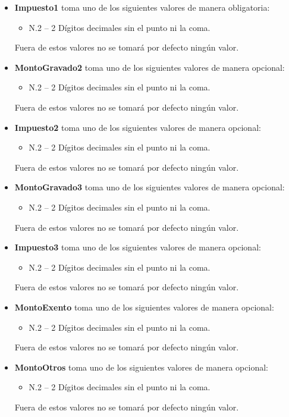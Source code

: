 \documentclass{article}
\begin{document}
\begin{itemize}
    \item \textbf{Impuesto1} toma uno de los siguientes valores de manera obligatoria:
    \begin{itemize}
        \item N.2 – 2 Dígitos decimales sin el punto ni la coma.
    \end{itemize}
    Fuera de estos valores no se tomará por defecto ningún valor.

    \item \textbf{MontoGravado2} toma uno de los siguientes valores de manera opcional:
    \begin{itemize}
        \item N.2 – 2 Dígitos decimales sin el punto ni la coma.
    \end{itemize}
    Fuera de estos valores no se tomará por defecto ningún valor.

    \item \textbf{Impuesto2} toma uno de los siguientes valores de manera opcional:
    \begin{itemize}
        \item N.2 – 2 Dígitos decimales sin el punto ni la coma.
    \end{itemize}
    Fuera de estos valores no se tomará por defecto ningún valor.

    \item \textbf{MontoGravado3} toma uno de los siguientes valores de manera opcional:
    \begin{itemize}
        \item N.2 – 2 Dígitos decimales sin el punto ni la coma.
    \end{itemize}
    Fuera de estos valores no se tomará por defecto ningún valor.

    \item \textbf{Impuesto3} toma uno de los siguientes valores de manera opcional:
    \begin{itemize}
        \item N.2 – 2 Dígitos decimales sin el punto ni la coma.
    \end{itemize}
    Fuera de estos valores no se tomará por defecto ningún valor.

    \item \textbf{MontoExento} toma uno de los siguientes valores de manera opcional:
    \begin{itemize}
        \item N.2 – 2 Dígitos decimales sin el punto ni la coma.
    \end{itemize}
    Fuera de estos valores no se tomará por defecto ningún valor.

    \item \textbf{MontoOtros} toma uno de los siguientes valores de manera opcional:
    \begin{itemize}
        \item N.2 – 2 Dígitos decimales sin el punto ni la coma.
    \end{itemize}
    Fuera de estos valores no se tomará por defecto ningún valor.
\end{itemize}
\end{document}
